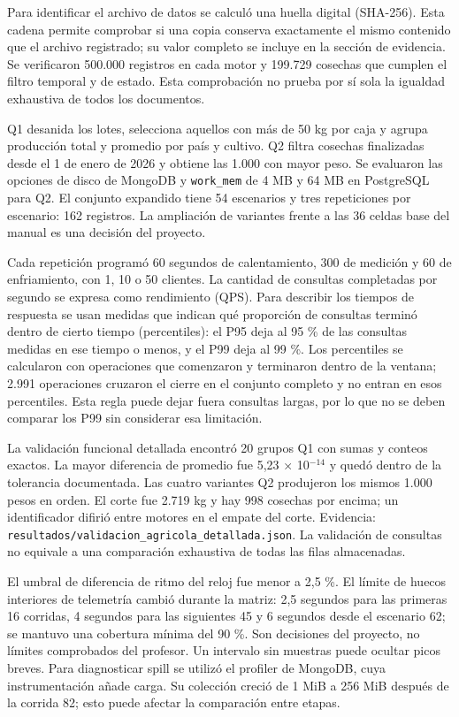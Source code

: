 \documentclass[12pt,letterpaper]{article}
\begin{document}
Para identificar el archivo de datos se calculó una huella digital (SHA-256). Esta cadena permite comprobar si una copia conserva exactamente el mismo contenido que el archivo registrado; su valor completo se incluye en la sección de evidencia. Se verificaron 500.000 registros en cada motor y 199.729 cosechas que cumplen el filtro temporal y de estado. Esta comprobación no prueba por sí sola la igualdad exhaustiva de todos los documentos.

Q1 desanida los lotes, selecciona aquellos con más de 50 kg por caja y agrupa producción total y promedio por país y cultivo. Q2 filtra cosechas finalizadas desde el 1 de enero de 2026 y obtiene las 1.000 con mayor peso. Se evaluaron las opciones de disco de MongoDB y \texttt{work\_\allowbreak{}mem} de 4 MB y 64 MB en PostgreSQL para Q2. El conjunto expandido tiene 54 escenarios y tres repeticiones por escenario: 162 registros. La ampliación de variantes frente a las 36 celdas base del manual es una decisión del proyecto.

Cada repetición programó 60 segundos de calentamiento, 300 de medición y 60 de enfriamiento, con 1, 10 o 50 clientes. La cantidad de consultas completadas por segundo se expresa como rendimiento (QPS). Para describir los tiempos de respuesta se usan medidas que indican qué proporción de consultas terminó dentro de cierto tiempo (percentiles): el P95 deja al 95 \% de las consultas medidas en ese tiempo o menos, y el P99 deja al 99 \%. Los percentiles se calcularon con operaciones que comenzaron y terminaron dentro de la ventana; 2.991 operaciones cruzaron el cierre en el conjunto completo y no entran en esos percentiles. Esta regla puede dejar fuera consultas largas, por lo que no se deben comparar los P99 sin considerar esa limitación.

La validación funcional detallada encontró 20 grupos Q1 con sumas y conteos exactos. La mayor diferencia de promedio fue 5,23 × 10$^{-14}$ y quedó dentro de la tolerancia documentada. Las cuatro variantes Q2 produjeron los mismos 1.000 pesos en orden. El corte fue 2.719 kg y hay 998 cosechas por encima; un identificador difirió entre motores en el empate del corte. Evidencia: \texttt{resultados/\allowbreak{}validacion\_\allowbreak{}agricola\_\allowbreak{}detallada.json}. La validación de consultas no equivale a una comparación exhaustiva de todas las filas almacenadas.

El umbral de diferencia de ritmo del reloj fue menor a 2,5 \%. El límite de huecos interiores de telemetría cambió durante la matriz: 2,5 segundos para las primeras 16 corridas, 4 segundos para las siguientes 45 y 6 segundos desde el escenario 62; se mantuvo una cobertura mínima del 90 \%. Son decisiones del proyecto, no límites comprobados del profesor. Un intervalo sin muestras puede ocultar picos breves. Para diagnosticar spill se utilizó el profiler de MongoDB, cuya instrumentación añade carga. Su colección creció de 1 MiB a 256 MiB después de la corrida 82; esto puede afectar la comparación entre etapas.
\end{document}
